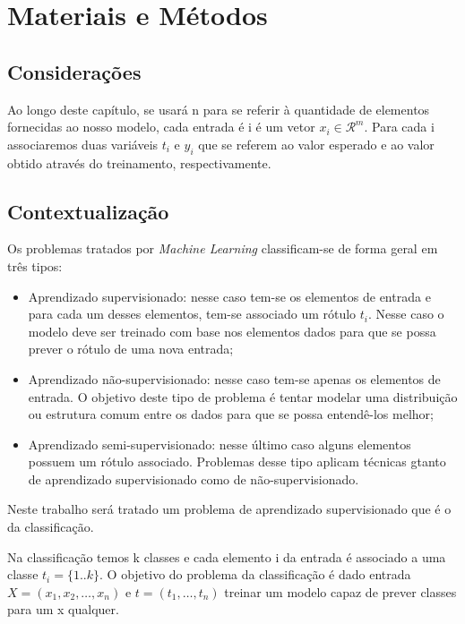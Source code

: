\chapter{Materiais e Métodos}

\section{Considerações}
\label{sec:considerations}

Ao longo deste capítulo, se usará n para se referir à quantidade de elementos
fornecidas ao nosso modelo, cada entrada é i é um vetor $x_i \in \mathcal{R}^m$.
Para cada i associaremos duas variáveis $t_i$ e $y_i$ que se referem ao valor
esperado e ao valor obtido através do treinamento, respectivamente. 

\section{Contextualização}
\label{sec:methods}

Os problemas tratados por \textit{Machine Learning} classificam-se de forma
geral em três tipos:

\begin{itemize}
	\item Aprendizado supervisionado: nesse caso tem-se os elementos de entrada e
	para cada um desses elementos, tem-se associado um rótulo $t_i$. Nesse caso o modelo
	deve ser treinado com base nos elementos dados para que se possa prever o rótulo %
	de uma nova entrada;
	\item Aprendizado não-supervisionado: nesse caso tem-se apenas os elementos de entrada. 
	O objetivo deste tipo de problema é tentar modelar uma distribuição ou estrutura comum
	entre os dados para que se possa entendê-los melhor;
	\item Aprendizado semi-supervisionado: nesse último caso alguns elementos possuem um rótulo
	associado. Problemas desse tipo aplicam técnicas gtanto de aprendizado supervisionado como
	de não-supervisionado.
\end{itemize}

Neste trabalho será tratado um problema de aprendizado supervisionado que é o da classificação.

Na classificação temos k classes e cada elemento i da entrada é associado a uma classe $t_i = \{1..k\}$.
O objetivo do problema da classificação é dado entrada $X = (x_1, x_2, \ldots, x_n)$ 
e $t = (t_1, \ldots, t_n)$ treinar um modelo capaz de prever classes para um x qualquer.

